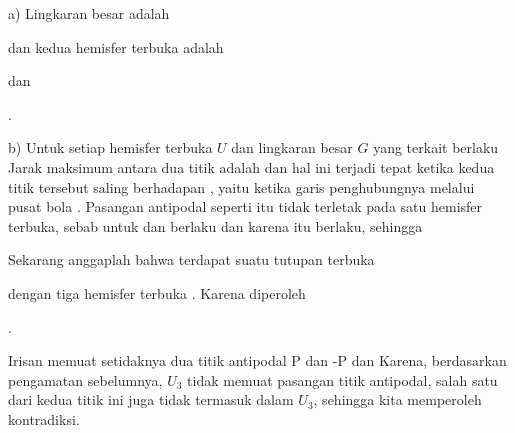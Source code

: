 a) Lingkaran besar adalah

 {  }

dan kedua hemisfer terbuka adalah

 {  }

dan

 { . }

b) Untuk setiap hemisfer terbuka $U$ dan lingkaran besar $G$ yang terkait berlaku
 Jarak maksimum antara dua titik
 adalah
 dan hal ini terjadi tepat ketika kedua titik tersebut saling berhadapan
 {} {}, yaitu ketika garis penghubungnya melalui pusat bola
 {} {}. Pasangan antipodal seperti itu tidak terletak pada satu hemisfer terbuka, sebab untuk
 dan
 berlaku
 dan karena itu
 berlaku, sehingga

Sekarang anggaplah bahwa terdapat suatu tutupan terbuka

 {  }

dengan tiga hemisfer terbuka
 {} {.}
Karena
 diperoleh

 { . }

Irisan
 memuat setidaknya dua titik antipodal
\mathkor {} {P} {dan} {-P} {}
dan
 Karena, berdasarkan pengamatan sebelumnya, $U_3$ tidak memuat pasangan titik antipodal, salah satu dari kedua titik ini juga tidak termasuk dalam $U_3$, sehingga kita memperoleh kontradiksi.
